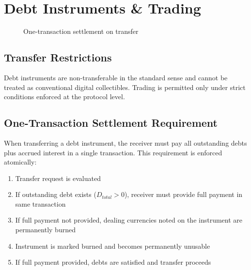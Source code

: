 \documentclass[11pt,a4paper]{article}
\begin{document}
\section{Debt Instruments \& Trading}
\begin{figure}[H]
\centering
{}
\caption{One-transaction settlement on transfer}
\label{fig:trading}
\end{figure}

\subsection{Transfer Restrictions}
Debt instruments are non-transferable in the standard sense and cannot be treated as conventional digital collectibles. Trading is permitted only under strict conditions enforced at the protocol level.

\subsection{One-Transaction Settlement Requirement}
When transferring a debt instrument, the receiver must pay all outstanding debts plus accrued interest in a single transaction. This requirement is enforced atomically:
\begin{enumerate}
\item Transfer request is evaluated
\item If outstanding debt exists ($D_{total} > 0$), receiver must provide full payment in same transaction
\item If full payment not provided, dealing currencies noted on the instrument are permanently burned
\item Instrument is marked burned and becomes permanently unusable
\item If full payment provided, debts are satisfied and transfer proceeds
\end{enumerate}
\end{document}
